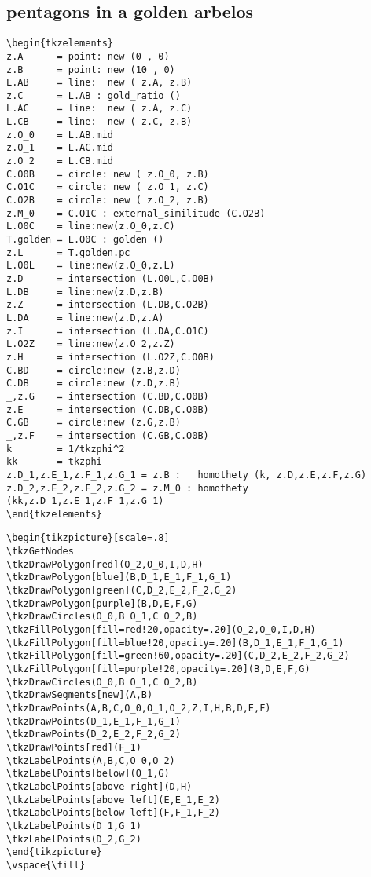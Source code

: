 
\subsection{pentagons in a golden arbelos} %
\label{sub:golden_arbelos}

\begin{verbatim}
\begin{tkzelements}
z.A      = point: new (0 , 0)
z.B      = point: new (10 , 0)
L.AB     = line:  new ( z.A, z.B)
z.C      = L.AB : gold_ratio ()
L.AC     = line:  new ( z.A, z.C)
L.CB     = line:  new ( z.C, z.B)
z.O_0    = L.AB.mid
z.O_1    = L.AC.mid
z.O_2    = L.CB.mid
C.O0B    = circle: new ( z.O_0, z.B)
C.O1C    = circle: new ( z.O_1, z.C)
C.O2B    = circle: new ( z.O_2, z.B)
z.M_0    = C.O1C : external_similitude (C.O2B)
L.O0C    = line:new(z.O_0,z.C)
T.golden = L.O0C : golden ()
z.L      = T.golden.pc
L.O0L    = line:new(z.O_0,z.L)
z.D      = intersection (L.O0L,C.O0B)
L.DB     = line:new(z.D,z.B)
z.Z      = intersection (L.DB,C.O2B)
L.DA     = line:new(z.D,z.A)
z.I      = intersection (L.DA,C.O1C)
L.O2Z    = line:new(z.O_2,z.Z)
z.H      = intersection (L.O2Z,C.O0B)
C.BD     = circle:new (z.B,z.D)
C.DB     = circle:new (z.D,z.B)
_,z.G    = intersection (C.BD,C.O0B)
z.E      = intersection (C.DB,C.O0B)
C.GB     = circle:new (z.G,z.B)
_,z.F    = intersection (C.GB,C.O0B)
k        = 1/tkzphi^2
kk       = tkzphi
z.D_1,z.E_1,z.F_1,z.G_1 = z.B :   homothety (k, z.D,z.E,z.F,z.G)
z.D_2,z.E_2,z.F_2,z.G_2 = z.M_0 : homothety (kk,z.D_1,z.E_1,z.F_1,z.G_1)
\end{tkzelements}
\end{verbatim}

\begin{verbatim}
\begin{tikzpicture}[scale=.8]
\tkzGetNodes
\tkzDrawPolygon[red](O_2,O_0,I,D,H)
\tkzDrawPolygon[blue](B,D_1,E_1,F_1,G_1)
\tkzDrawPolygon[green](C,D_2,E_2,F_2,G_2)
\tkzDrawPolygon[purple](B,D,E,F,G)
\tkzDrawCircles(O_0,B O_1,C O_2,B)
\tkzFillPolygon[fill=red!20,opacity=.20](O_2,O_0,I,D,H)
\tkzFillPolygon[fill=blue!20,opacity=.20](B,D_1,E_1,F_1,G_1)
\tkzFillPolygon[fill=green!60,opacity=.20](C,D_2,E_2,F_2,G_2)
\tkzFillPolygon[fill=purple!20,opacity=.20](B,D,E,F,G)
\tkzDrawCircles(O_0,B O_1,C O_2,B)
\tkzDrawSegments[new](A,B)
\tkzDrawPoints(A,B,C,O_0,O_1,O_2,Z,I,H,B,D,E,F)
\tkzDrawPoints(D_1,E_1,F_1,G_1)
\tkzDrawPoints(D_2,E_2,F_2,G_2)
\tkzDrawPoints[red](F_1)
\tkzLabelPoints(A,B,C,O_0,O_2)
\tkzLabelPoints[below](O_1,G)
\tkzLabelPoints[above right](D,H)
\tkzLabelPoints[above left](E,E_1,E_2)
\tkzLabelPoints[below left](F,F_1,F_2)
\tkzLabelPoints(D_1,G_1)
\tkzLabelPoints(D_2,G_2)
\end{tikzpicture}
\vspace{\fill}
\end{verbatim}

